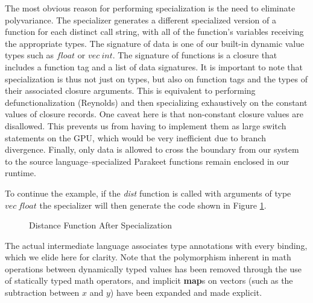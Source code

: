 \documentclass[preprint]{sigplanconf}
\begin{document}
The most obvious reason for performing specialization is the need to eliminate
polyvariance.  The specializer generates a different specialized version
of a function for each distinct call string, with all of the function's
variables receiving the appropriate types.  The signature of data is one of our
built-in dynamic value types such as $float$ or $vec~int$.  The signature of
functions is a closure that includes a function tag and a list of data
signatures.  It is important to note that specialization is thus not just on
types, but also on function tags and the types of their associated closure
arguments. This is equivalent to performing defunctionalization (Reynolds) and
then specializing exhaustively on the constant values of closure records. One
caveat here is that non-constant closure values are disallowed.  This prevents
us from having to implement them as large switch statements on the GPU, which
would be very inefficient due to branch divergence.  Finally, only data is
allowed to cross the boundary from our system to the source
language--specialized Parakeet functions remain enclosed in our runtime.

To continue the example, if the \textit{dist} function is called with arguments
of type $vec~ float$ the specializer will then generate the code shown in Figure
\ref{SpecDist}.

\begin{figure}[h!]
\caption{Distance Function After Specialization}
\label{SpecDist}
\end{figure}

The actual intermediate language associates type annotations with every binding,
which we elide here for clarity. Note that the polymorphism inherent in math
operations between dynamically typed values has been removed through the use of
statically typed math operators, and implicit \textbf{map}s on vectors (such
as the subtraction between $x$ and $y$) have been expanded and made explicit.
\end{document}
